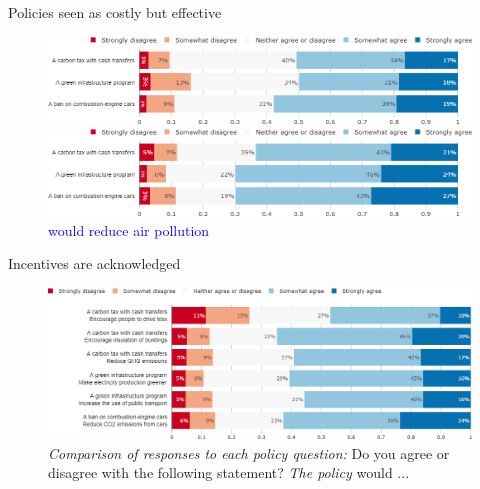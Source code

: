 \begin{framefont}{\small}
\begin{frame}{Policies seen as costly but effective}
\begin{figure}[h!]
\vspace{-.1cm}
\centering
\caption{\textit{Comparison of responses to each policy question:} Do you agree or disagree with the following statement? \textit{The policy} would be \textcolor{blue}{costly to fight climate change}}
\includegraphics[width=.87\paperwidth]{../figures/FR/policies_cost_effective_FR.png}
\caption{ \textcolor{blue}{would reduce air pollution}}
\includegraphics[width=.87\paperwidth]{../figures/FR/policies_less_pollution_FR.png}
\end{figure}
\end{frame}

\begin{frame}{Incentives are acknowledged}
\begin{figure}[h!]
\vspace{-.1cm}
\centering
\caption{\textit{Comparison of responses to each policy question:} Do you agree or disagree with the following statement? \textit{The policy} would ...}
\includegraphics[width=.87\paperwidth]{../figures/FR/policies_effects_FR.png}
\end{figure}
\end{frame}



\end{framefont}
